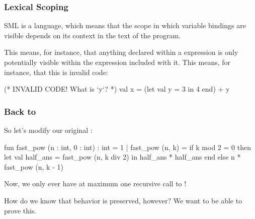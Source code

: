 \documentclass[aspectratio=169, handout]{beamer}
\begin{document}
\begin{frame}[fragile]
  \frametitle{Lexical Scoping}

  SML is a  language, which means that the scope in which
  variable bindings are visible depends on its context in the text of the program.

  \pause
  \vspace{\fill}

  This means, for instance, that anything declared within a  expression
  is only potentially visible within the expression included with it. This means,
  for instance, that this is invalid code:

  \begin{codeblock}
    (* INVALID CODE! What is `y`? *)
    val x =
      (let
        val y = 3
      in
        4
      end) + y
  \end{codeblock}
\end{frame}

\begin{frame}[fragile]
  \frametitle{Back to }

  So let's modify our original :

  \pause

  { \small
  \begin{codeblock}
    fun fast_pow (n : int, 0 : int) : int = 1
      | fast_pow (n, k) =
          if k mod 2 = 0 then
            let
              val half_ans = fast_pow (n, k div 2)
            in
              half_ans * half_ans
            end
          else
            n * fast_pow (n, k - 1)
  \end{codeblock}
  }

  Now, we only ever have at maximum one recursive call to !

  \pause
  \vspace{\fill}

  How do we know that behavior is preserved, however? We want to be able to
  prove this.
\end{frame}
\end{document}
